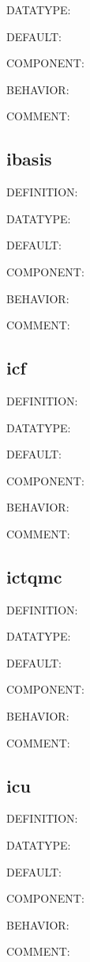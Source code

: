 {\color{green}DATATYPE:}

{\color{blue}DEFAULT:}

{\color{brown}COMPONENT:}

{\color{purple}BEHAVIOR:}

{\color{olive}COMMENT:}

\subsection{ibasis}
{\color{red}DEFINITION:}

{\color{green}DATATYPE:}

{\color{blue}DEFAULT:}

{\color{brown}COMPONENT:}

{\color{purple}BEHAVIOR:}

{\color{olive}COMMENT:}

\subsection{icf}
{\color{red}DEFINITION:}

{\color{green}DATATYPE:}

{\color{blue}DEFAULT:}

{\color{brown}COMPONENT:}

{\color{purple}BEHAVIOR:}

{\color{olive}COMMENT:}

\subsection{ictqmc}
{\color{red}DEFINITION:}

{\color{green}DATATYPE:}

{\color{blue}DEFAULT:}

{\color{brown}COMPONENT:}

{\color{purple}BEHAVIOR:}

{\color{olive}COMMENT:}

\subsection{icu}
{\color{red}DEFINITION:}

{\color{green}DATATYPE:}

{\color{blue}DEFAULT:}

{\color{brown}COMPONENT:}

{\color{purple}BEHAVIOR:}

{\color{olive}COMMENT:}

